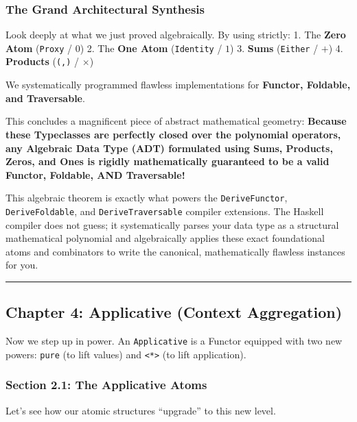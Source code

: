 \documentclass[
]{article}
\begin{document}
\subsubsection{The Grand Architectural
Synthesis}\label{the-grand-architectural-synthesis}

Look deeply at what we just proved algebraically. By using strictly: 1.
The \textbf{Zero Atom} (\texttt{Proxy} / \(0\)) 2. The \textbf{One Atom}
(\texttt{Identity} / \(1\)) 3. \textbf{Sums} (\texttt{Either} / \(+\))
4. \textbf{Products} (\texttt{(,)} / \(\times\))

We systematically programmed flawless implementations for
\textbf{Functor, Foldable, and Traversable}.

This concludes a magnificent piece of abstract mathematical geometry:
\textbf{Because these Typeclasses are perfectly closed over the
polynomial operators, any Algebraic Data Type (ADT) formulated using
Sums, Products, Zeros, and Ones is rigidly mathematically guaranteed to
be a valid Functor, Foldable, AND Traversable!}

This algebraic theorem is exactly what powers the
\texttt{DeriveFunctor}, \texttt{DeriveFoldable}, and
\texttt{DeriveTraversable} compiler extensions. The Haskell compiler
does not guess; it systematically parses your data type as a structural
mathematical polynomial and algebraically applies these exact
foundational atoms and combinators to write the canonical,
mathematically flawless instances for you.

\begin{center}\rule{0.5\linewidth}{0.5pt}\end{center}

\subsection{Chapter 4: Applicative (Context
Aggregation)}\label{chapter-4-applicative-context-aggregation}

Now we step up in power. An \texttt{Applicative} is a Functor equipped
with two new powers: \texttt{pure} (to lift values) and
\texttt{\textless{}*\textgreater{}} (to lift application).

\subsubsection{Section 2.1: The Applicative
Atoms}\label{section-2.1-the-applicative-atoms}

Let's see how our atomic structures ``upgrade'' to this new level.
\end{document}
